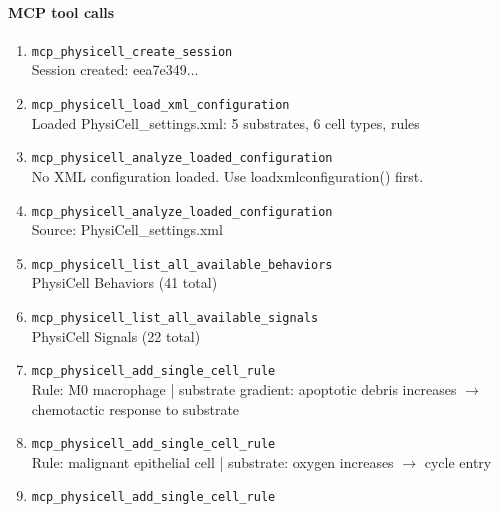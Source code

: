 \paragraph{MCP tool calls}
\begingroup
\small
\setlength{\itemsep}{5pt}
\setlength{\parskip}{0pt}
\begin{enumerate}
\item[1.] \texttt{mcp\_\allowbreak{}physicell\_\allowbreak{}create\_\allowbreak{}session}
\hfill\\
\RaggedRight Session created: eea7e349...
\item[2.] \texttt{mcp\_\allowbreak{}physicell\_\allowbreak{}load\_\allowbreak{}xml\_\allowbreak{}configuration}
\hfill\\
\RaggedRight Loaded PhysiCell\_settings.xml: 5 substrates, 6 cell types, rules
\item[3.] \texttt{mcp\_\allowbreak{}physicell\_\allowbreak{}analyze\_\allowbreak{}loaded\_\allowbreak{}configuration}
\hfill\\
\RaggedRight No XML configuration loaded. Use loadxmlconfiguration() first.
\item[4.] \texttt{mcp\_\allowbreak{}physicell\_\allowbreak{}analyze\_\allowbreak{}loaded\_\allowbreak{}configuration}
\hfill\\
\RaggedRight Source: PhysiCell\_settings.xml
\item[5.] \texttt{mcp\_\allowbreak{}physicell\_\allowbreak{}list\_\allowbreak{}all\_\allowbreak{}available\_\allowbreak{}behaviors}
\hfill\\
\RaggedRight PhysiCell Behaviors (41 total)
\item[6.] \texttt{mcp\_\allowbreak{}physicell\_\allowbreak{}list\_\allowbreak{}all\_\allowbreak{}available\_\allowbreak{}signals}
\hfill\\
\RaggedRight PhysiCell Signals (22 total)
\item[7.] \texttt{mcp\_\allowbreak{}physicell\_\allowbreak{}add\_\allowbreak{}single\_\allowbreak{}cell\_\allowbreak{}rule}
\hfill\\
\RaggedRight Rule: M0 macrophage | substrate gradient: apoptotic debris increases \ensuremath{\rightarrow} chemotactic response to substrate
\item[8.] \texttt{mcp\_\allowbreak{}physicell\_\allowbreak{}add\_\allowbreak{}single\_\allowbreak{}cell\_\allowbreak{}rule}
\hfill\\
\RaggedRight Rule: malignant epithelial cell | substrate: oxygen increases \ensuremath{\rightarrow} cycle entry
\item[9.] \texttt{mcp\_\allowbreak{}physicell\_\allowbreak{}add\_\allowbreak{}single\_\allowbreak{}cell\_\allowbreak{}rule}

\end{enumerate}
